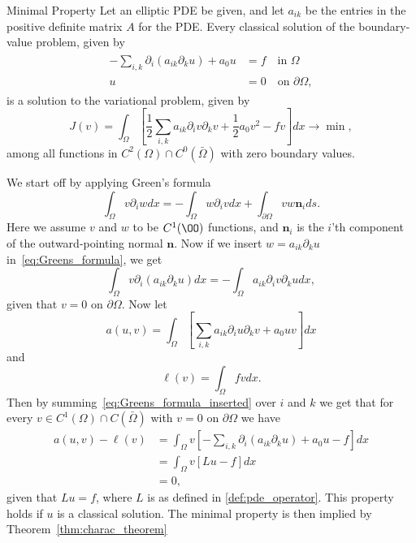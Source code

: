 \begin{thmx}{Minimal Property}
    Let an elliptic PDE be given, and let $a_{ik}$ be the entries in the positive definite matrix $A$ for the PDE.
    Every classical solution of the boundary-value problem, given by
\begin{align}
\begin{split}
    -\sum_{i,k} \partial_i (a_{ik}\partial_k u) + a_0 u &= f \quad \text{in } \Omega  \\
    u &= 0 \quad \text{on } \partial \Omega,
\end{split}
\end{align}
    is a solution to the variational problem, given by
    \[
        J(v)=\int_\Omega \left [\frac{1}{2}\sum_{i,k} a_{ik} \partial_i v\partial_k v + \frac{1}{2} a_0 v^2 -fv\right ]dx \longrightarrow \min,
    \]
    among all functions in $C^2(\Omega)\cap C^0(\bar{\Omega})$ with zero boundary values.
    \label{thm:minimal_property} 
\end{thmx}
\begin{bev}
    We start off by applying Green's formula
    \begin{equation}
    \label{eq:Greens_formula}
        \int_\Omega v\partial_i w dx = -\int_\Omega w \partial_i v dx + \int_{\partial \Omega} v w \mathbf{n}_i ds.
    \end{equation}
    Here we assume $v$ and $w$ to be $C^1(\OO)$ functions, and $\mathbf{n}_i$ is the $i$'th component of the outward-pointing normal $\mathbf{n}$.
    Now if we insert $w=a_{ik}\partial_k u$ in~\eqref{eq:Greens_formula}, we get
    \begin{equation}
    \label{eq:Greens_formula_inserted}
        \int_\Omega v\partial_i (a_{ik} \partial_k u) dx = -\int_\Omega a_{ik} \partial_i v\partial_k u dx,
    \end{equation}
    given that $v=0$ on $\partial \Omega$.
    Now let 
    \begin{equation}
    \label{eq:a(u,v)}
        a(u,v) = \int_\Omega \left[\sum_{i,k} a_{ik} \partial_i u \partial_k v +a_0 uv \right]dx
    \end{equation}
    and
    \begin{equation}
    \label{eq:l(v)}
        \ell(v) = \int_\Omega fv dx.
    \end{equation}
    Then by summing~\eqref{eq:Greens_formula_inserted} over $i$ and $k$ we get that for every $v\in C^1(\Omega) \cap C(\bar{\Omega})$ with $v=0$ on $\partial \Omega$ we have
    \begin{align}
        a(u,v) - \ell(v) &= \int_\Omega v\left[ -\sum_{i,k} \partial_i (a_{ik} \partial_k u) + a_0 u - f \right] dx \label{eq:min_prop_variational_problem}\\
        &= \int_\Omega v [Lu - f] dx \nonumber \\
        &= 0, \nonumber
    \end{align}
    given that $Lu = f$, where $L$ is as defined in \eqref{def:pde_operator}. This property holds if $u$ is a classical solution.
     The minimal property is then implied by Theorem~\ref{thm:charac_theorem}
\end{bev}